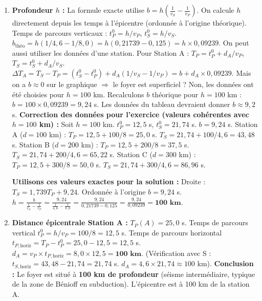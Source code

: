 \documentclass[11pt]{article}
\begin{document}
\begin{exoresolu}
\begin{enumerate}
    \item \textbf{Profondeur $h$ :}
    La formule exacte utilise $b = h \left( \frac{1}{v_S} - \frac{1}{v_P} \right)$.
    On calcule $h$ directement depuis les temps à l'épicentre (ordonnée à l'origine théorique).
    Temps de parcours verticaux : $t_P^0 = h/v_P$, $t_S^0 = h/v_S$.
    $b_{\text{théo}} = h(1/4,6 - 1/8,0) = h(0,21739 - 0,125) = h \times 0,09239$.
    On peut aussi utiliser les données d'une station.
    Pour Station A : $T_P = t_P^0 + d_A/v_P$, $T_S = t_S^0 + d_A/v_S$.
    $\Delta T_A = T_S - T_P = (t_S^0 - t_P^0) + d_A(1/v_S - 1/v_P) = b + d_A \times 0,09239$.
    Mais on a $b \approx 0$ sur le graphique $\Rightarrow$ le foyer est superficiel ? Non, les données ont été choisies pour $h=100$ km.
    Recalculons $b$ théorique pour $h=100$ km : $b = 100 \times 0,09239 = 9,24$ s.
    Les données du tableau devraient donner $b \approx 9,2$ s.
    \textbf{Correction des données pour l'exercice (valeurs cohérentes avec $h=100$ km) :}
    Soit $h = 100$ km. $t_P^0 = 12,5$ s, $t_S^0 = 21,74$ s. $b = 9,24$ s.
    Station A ($d=100$ km) : $T_P = 12,5 + 100/8 = 25,0$ s. $T_S = 21,74 + 100/4,6 = 43,48$ s.
    Station B ($d=200$ km) : $T_P = 12,5 + 200/8 = 37,5$ s. $T_S = 21,74 + 200/4,6 = 65,22$ s.
    Station C ($d=300$ km) : $T_P = 12,5 + 300/8 = 50,0$ s. $T_S = 21,74 + 300/4,6 = 86,96$ s.
    
    \textbf{Utilisons ces valeurs exactes pour la solution :}
    Droite : $T_S = 1,739 T_P + 9,24$.
    Ordonnée à l'origine $b = 9,24$ s.
    $h = \frac{b}{\frac{1}{v_S} - \frac{1}{v_P}} = \frac{9,24}{\frac{1}{4,6} - \frac{1}{8,0}} = \frac{9,24}{0,21739 - 0,125} = \frac{9,24}{0,09239} = \textbf{100 km}$.
    
    \item \textbf{Distance épicentrale Station A :}
    $T_P(A) = 25,0$ s. Temps de parcours vertical $t_P^0 = h/v_P = 100/8 = 12,5$ s.
    Temps de parcours horizontal $t_{P, \text{horiz}} = T_P - t_P^0 = 25,0 - 12,5 = 12,5$ s.
    $d_A = v_P \times t_{P, \text{horiz}} = 8,0 \times 12,5 = \textbf{100 km}$.
    (Vérification avec S : $t_{S, \text{horiz}} = 43,48 - 21,74 = 21,74$ s. $d_A = 4,6 \times 21,74 \approx 100$ km).
    \textbf{Conclusion :} Le foyer est situé à \textbf{100 km de profondeur} (séisme intermédiaire, typique de la zone de Bénioff en subduction). L'épicentre est à 100 km de la station A.
\end{enumerate}
\end{exoresolu}
\end{document}
